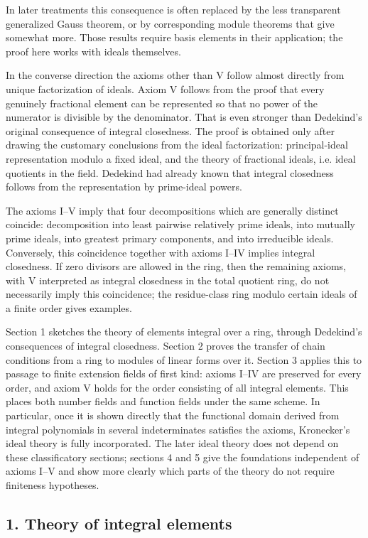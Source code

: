 \documentclass[11pt]{article}
\begin{document}
In later treatments this consequence is often replaced by the less transparent generalized Gauss theorem, or by corresponding module theorems that give somewhat more. Those results require basis elements in their application; the proof here works with ideals themselves.

In the converse direction the axioms other than V follow almost directly from unique factorization of ideals. Axiom V follows from the proof that every genuinely fractional element can be represented so that no power of the numerator is divisible by the denominator. That is even stronger than Dedekind's original consequence of integral closedness. The proof is obtained only after drawing the customary conclusions from the ideal factorization: principal-ideal representation modulo a fixed ideal, and the theory of fractional ideals, i.e. ideal quotients in the field. Dedekind had already known that integral closedness follows from the representation by prime-ideal powers.

The axioms I--V imply that four decompositions which are generally distinct coincide: decomposition into least pairwise relatively prime ideals, into mutually prime ideals, into greatest primary components, and into irreducible ideals. Conversely, this coincidence together with axioms I--IV implies integral closedness. If zero divisors are allowed in the ring, then the remaining axioms, with V interpreted as integral closedness in the total quotient ring, do not necessarily imply this coincidence; the residue-class ring modulo certain ideals of a finite order gives examples.

Section 1 sketches the theory of elements integral over a ring, through Dedekind's consequences of integral closedness. Section 2 proves the transfer of chain conditions from a ring to modules of linear forms over it. Section 3 applies this to passage to finite extension fields of first kind: axioms I--IV are preserved for every order, and axiom V holds for the order consisting of all integral elements. This places both number fields and function fields under the same scheme. In particular, once it is shown directly that the functional domain derived from integral polynomials in several indeterminates satisfies the axioms, Kronecker's ideal theory is fully incorporated. The later ideal theory does not depend on these classificatory sections; sections 4 and 5 give the foundations independent of axioms I--V and show more clearly which parts of the theory do not require finiteness hypotheses.

\subsection{1. Theory of integral elements}
\end{document}
